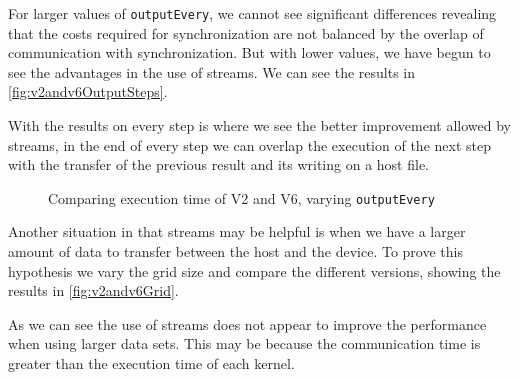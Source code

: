 \documentclass[conference]{IEEEtran}
\begin{document}
For larger values of \texttt{outputEvery}, we cannot see significant differences revealing that the costs required for synchronization are not balanced by the overlap of communication with synchronization. But with lower values, we have begun to see the advantages in the use of streams. We can see the results in \autoref{fig:v2andv6OutputSteps}.

With the results on every step is where we see the better improvement allowed by streams, in the end of every step we can overlap the execution of the next step with the transfer of the previous result and its writing on a host file.


\begin{figure}[ht]
  \centering
  \caption{Comparing execution time of V2 and V6, varying \texttt{outputEvery}}
  \label{fig:v2andv6OutputSteps}
\end{figure}



Another situation in that streams may be helpful is when we have a larger amount of data to transfer between the host and the device. To prove this hypothesis we vary the grid size and compare the different versions, showing the results in \autoref{fig:v2andv6Grid}.

As we can see the use of streams does not appear to improve the performance when using larger data sets. This may be because the communication time is greater than the execution time of each kernel.
\end{document}
